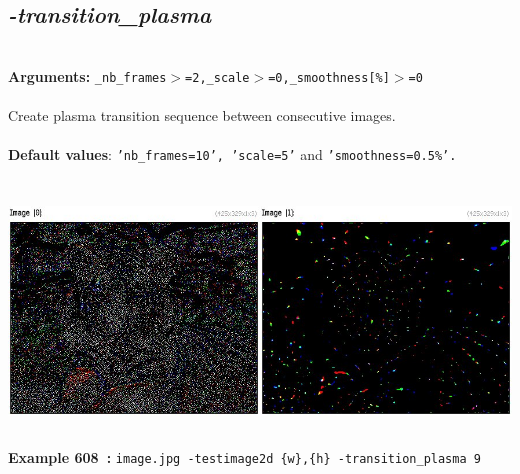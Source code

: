 \documentclass[a4paper,11pt,twoside]{book}
\begin{document}
\subsection{\emph{-transition\_plasma} }\vspace*{-0.5em}
~\\\textbf{Arguments: } 
{\small \texttt{\_nb\_frames$>$=2,\_scale$>$=0,\_smoothness[\%]$>$=0}}\\~\\
Create plasma transition sequence between consecutive images.
~\\~\\\textbf{Default values}: {\small \texttt{'nb\_frames=10', 'scale=5'} and \texttt{'smoothness=0.5\%'.}}
\begin{center}\includegraphics[keepaspectratio=true,height=7cm,width=\textwidth]{img/gmic_def608.jpg}\\
{\footnotesize \textbf{Example 608~:} \texttt{image.jpg -testimage2d \{w\},\{h\} -transition\_plasma 9}}
\end{center}
\end{document}
